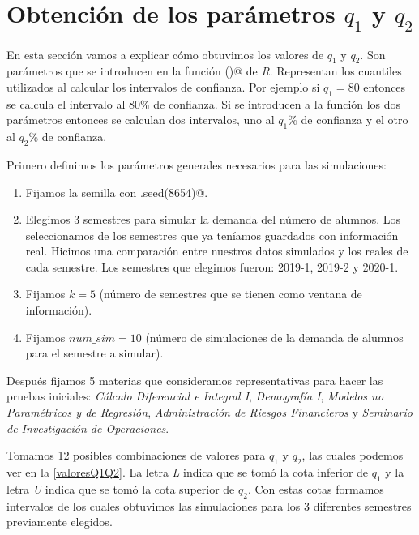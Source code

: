 \section{Obtención de los parámetros $q_{1}$ y $q_{2}$}

En esta sección vamos a explicar cómo obtuvimos los valores de $q_{1}$ y $q_{2}$. Son parámetros que se introducen en la función \verb@hw()@ de \textit{R}. Representan los cuantiles utilizados al calcular los intervalos de confianza. Por ejemplo si $q_{1} = 80$ entonces se calcula el intervalo al $80\%$ de confianza. Si se introducen a la función los dos parámetros entonces se calculan dos intervalos, uno al $q_{1}\%$ de confianza y el otro al $q_{2}\%$ de confianza.

Primero definimos los parámetros generales necesarios para las simulaciones:

\begin{enumerate}
\item Fijamos la semilla con \verb@set.seed(8654)@.

\item Elegimos 3 semestres para simular la demanda del número de alumnos. Los seleccionamos de los semestres que ya teníamos guardados con información real. Hicimos una comparación entre nuestros datos simulados y los reales de cada semestre. Los semestres que elegimos fueron: 2019-1, 2019-2 y 2020-1.

\item Fijamos $k = 5$ (número de semestres que se tienen como ventana de información).

\item Fijamos $num\_sim = 10$ (número de simulaciones de la demanda de alumnos para el semestre a simular).
\end{enumerate}


Después fijamos 5 materias que consideramos representativas para hacer las pruebas iniciales: \textit{Cálculo Diferencial e Integral I}, \textit{Demografía I}, \textit{Modelos no Paramétricos y de Regresión}, \textit{Administración de Riesgos Financieros} y \textit{Seminario de Investigación de Operaciones}.

Tomamos 12 posibles combinaciones de valores para $q_{1}$ y $q_{2}$, las cuales podemos ver en la \tablename{\ref{valoresQ1Q2}}. La letra \textit{L} indica que se tomó la cota inferior de $q_{1}$ y la letra \textit{U} indica que se tomó la cota superior de $q_{2}$. Con estas cotas formamos intervalos de los cuales obtuvimos las simulaciones para los 3 diferentes semestres previamente elegidos. %

